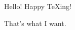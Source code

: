 \documentclass{article}
\begin{document}
Hello!
Happy \TeX ing!

That's what I want.
\end{document}
